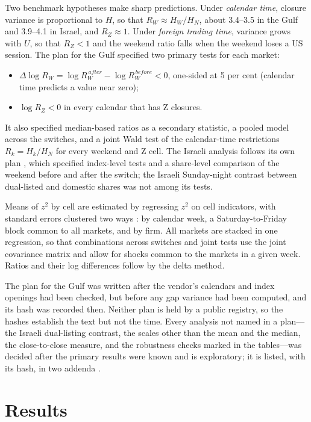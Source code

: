 Two benchmark hypotheses make sharp predictions. Under \emph{calendar time}, closure variance is proportional to $H$, so that $R_W\approx H_W/H_N$, about 3.4--3.5 in the Gulf and 3.9--4.1 in Israel, and $R_Z\approx1$. Under \emph{foreign trading time}, variance grows with $U$, so that $R_Z<1$ and the weekend ratio falls when the weekend loses a US session. The plan for the Gulf \citep{PAP2} specified two primary tests for each market:
\begin{itemize}
\item[H1] $\Delta\log R_W=\log R_W^{\,after}-\log R_W^{\,before}<0$, one-sided at 5 per cent (calendar time predicts a value near zero);
\item[H2] $\log R_Z<0$ in every calendar that has Z closures.
\end{itemize}
It also specified median-based ratios as a secondary statistic, a pooled model across the switches, and a joint Wald test of the calendar-time restrictions $R_k=H_k/H_N$ for every weekend and Z cell. The Israeli analysis follows its own plan \citep{PAP1}, which specified index-level tests and a share-level comparison of the weekend before and after the switch; the Israeli Sunday-night contrast between dual-listed and domestic shares was not among its tests.

Means of $z^2$ by cell are estimated by regressing $z^2$ on cell indicators, with standard errors clustered two ways \citep{Cameron2011}: by calendar week, a Saturday-to-Friday block common to all markets, and by firm. All markets are stacked in one regression, so that combinations across switches and joint tests use the joint covariance matrix and allow for shocks common to the markets in a given week. Ratios and their log differences follow by the delta method.

The plan for the Gulf was written after the vendor's calendars and index openings had been checked, but before any gap variance had been computed, and its hash was recorded then. Neither plan is held by a public registry, so the hashes establish the text but not the time. Every analysis not named in a plan---the Israeli dual-listing contrast, the scales other than the mean and the median, the close-to-close measure, and the robustness checks marked in the tables---was decided after the primary results were known and is exploratory; it is listed, with its hash, in two addenda \citep{PAP3,PAP4}.

\section{Results}\label{sec:results}

